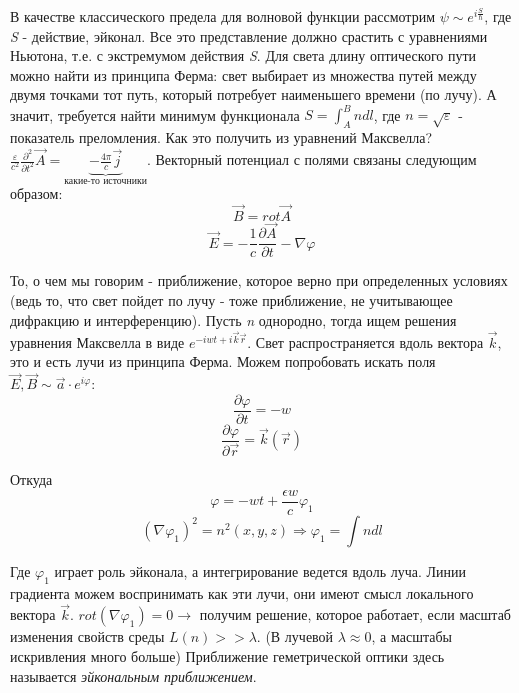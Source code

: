 \par В качестве классического предела для волновой функции рассмотрим $\psi \sim e^{i \frac{S}{\hbar}}$, где \textit{S} - действие, эйконал. Все это представление должно срастить с уравнениями Ньютона, т.е. с экстремумом действия \textit{S}. Для света длину оптического пути можно найти из принципа Ферма: свет выбирает из множества путей между двумя точками тот путь, который потребует наименьшего времени (по лучу). А значит, требуется найти минимум функционала $ S = \int_{A}^{B} n dl$, где $n = \sqrt{\varepsilon}$ - показатель преломления. Как это получить из уравнений Максвелла? $ \frac{\varepsilon}{c^2} \frac{\partial ^2 }{\partial t ^2} \vec{A} = \underbrace{- \frac{4 \pi}{c} \vec{j}}_{\text{какие-то источники}} $. Векторный потенциал с полями связаны следующим образом:
$$\vec{B} = rot \vec{A} $$
$$ \vec{E} = - \frac{1}{c} \frac{\partial \vec{A}}{\partial t} - \nabla \varphi$$
\par То, о чем мы говорим - приближение, которое верно при определенных условиях (ведь то, что свет пойдет по лучу - тоже приближение, не учитывающее дифракцию и интерференцию). Пусть \textit{n} однородно, тогда ищем решения уравнения Максвелла в виде $e^{-iwt +i \vec{k} \vec{r}}$. Свет распространяется вдоль вектора $\vec{k}$, это и есть лучи из принципа Ферма. Можем попробовать искать поля $\vec{E}, \vec{B} \sim \vec{a} \cdot e^{i \varphi}$:
$$ \frac{\partial \varphi}{\partial t} = -w $$
$$ \frac{\partial \varphi}{\partial \vec{r}} = \vec{k} (\vec{r}) $$
\par Откуда $$ \varphi = -wt + \frac{\epsilon w}{c} \varphi_1 $$
$$ (\nabla \varphi _1)^2 =n^2 (x,y,z) \Longrightarrow \varphi_1 = \int n dl $$
\par Где $\varphi_1$ играет роль эйконала, а интегрирование ведется вдоль луча. Линии градиента можем воспринимать как эти лучи, они имеют смысл локального вектора $\vec{k}$. $rot(\nabla \varphi_1)=0 \longrightarrow $ получим решение, которое работает, если масштаб изменения свойств среды $L(n) >> \lambda$. (В лучевой $\lambda \approx 0$, а масштабы искривления много больше) Приближение геметрической оптики здесь называется \textit{эйкональным приближением}.

